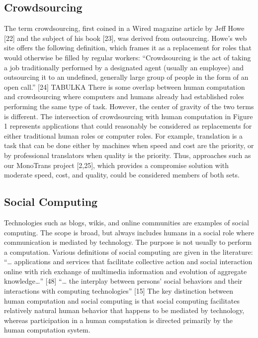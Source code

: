 \documentclass{sig-alternate}
\begin{document}
\subsection*{Crowdsourcing}
The term crowdsourcing, first coined in a Wired magazine article by Jeff Howe [22] and the subject of his book [23], was derived from outsourcing. Howe’s web site offers the following definition, which frames it as a replacement for roles that would otherwise be filled by regular workers:
“Crowdsourcing is the act of taking a job traditionally performed by a designated agent (usually an employee) and outsourcing it to an undefined, generally large group of people in the form of an open call.” [24] TABULKA 
There is some overlap between human computation and crowdsourcing where computers and humans already had established roles performing the same type of task. However, the center of gravity of the two terms is different.
The intersection of crowdsourcing with human computation in Figure 1 represents applications that could reasonably be considered as replacements for either traditional human roles or computer roles. For example, translation is a task that can be done either by machines when speed and cost are the priority, or by professional translators when quality is the priority. Thus, approaches such as our MonoTrans project [2,25], which provides a compromise solution with moderate speed, cost, and quality, could be considered members of both sets.
\subsection*{Social Computing}
Technologies such as blogs, wikis, and online communities are examples of social computing. The scope is broad, but always includes humans in a social role where communication is mediated by technology. The purpose is not usually to perform a computation. Various definitions of social computing are given in the literature:
“… applications and services that facilitate collective action and social interaction online with rich exchange of multimedia information and evolution of aggregate knowledge…” [48]
“… the interplay between persons' social behaviors and their interactions with computing technologies” [15]
The key distinction between human computation and social computing is that social computing facilitates relatively natural human behavior that happens to be mediated by technology, whereas participation in a human computation is directed primarily by the human computation system.
\end{document}
